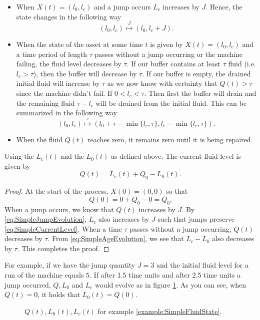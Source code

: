 \begin{itemize}
	\item When $X(t)=(l_0,l_c)$ and a jump occurs $L_c$ increases by $J$.
	Hence, the state changes in the following way
	\begin{equation}\label{eq:SimpleJumpEvolution}
	(l_0,l_c)\stackrel{J}{\mapsto} (l_0,l_c+J).
	\end{equation}
	\item When the state of the asset at some time $t$ is given by $X(t)=(l_0,l_c)$ and a time period of length $\tau$ passes without a jump occurring or the machine failing, the fluid level decreases by $\tau$.
	If our buffer contains at least $\tau$ fluid (i.e. $l_c>\tau$), then the buffer will decrease by $\tau$.
	If our buffer is empty, the drained initial fluid will increase by $\tau$ as we now know with certainty that $Q(t)>\tau$ since the machine didn't fail.
	If $0<l_c<\tau$. Then first the buffer will drain and the remaining fluid $\tau-l_c$ will be drained from the initial fluid.
	This can be summarized in the following way
	\begin{equation}\label{eq:SimpleAgeEvolution}
	(l_0,l_c)\stackrel\tau\mapsto (l_0+\tau-\min\{l_c,\tau\},l_c-\min\{l_c,\tau\}).
	\end{equation}
	\item When the fluid $Q(t)$ reaches zero, it remains zero until it is being repaired.
\end{itemize}
\begin{theorem}\label{theorem:SimpleCurrentLevel}
	Using the $L_c(t)$ and the $L_0(t)$ as defined above.
	The current fluid level is given by
	\begin{equation}\label{eq:SimpleCurrentLevel}
	Q(t)=L_c(t)+Q_0-L_0(t).
	\end{equation}
	\begin{proof}
		At the start of the process, $X(0)=(0,0)$ so that
		\[
		Q(0)=0+Q_0-0=Q_0.
		\]
		When a jump occurs, we know that $Q(t)$ increases by $J$.
		By \eqref{eq:SimpleJumpEvolution}, $L_c$ also increases by $J$ such that jumps preserve \eqref{eq:SimpleCurrentLevel}.
		When a time $\tau$ passes without a jump occurring, $Q(t)$ decreases by $\tau$.
		From \eqref{eq:SimpleAgeEvolution}, we see that $L_c-L_0$ also decreases by $\tau$.
		This completes the proof.
	\end{proof}
\end{theorem}

\begin{example}\label{example:SimpleFluidState}
	For example, if we have the jump quantity $J=3$ and the initial fluid level for a run of the machine equals $5$.
	If after 1.5 time units and after 2.5 time units a jump occurred, $Q,L_0$ and $L_c$ would evolve as in figure \ref{figure:SimpleFluidExampleQuantities}.
	As you can see, when $Q(t)=0$, it holds that $L_0(t)=Q(0)$.
\end{example}
\begin{figure}[H]\label{figure:SimpleFluidExampleQuantities}
\centering
\setlength{}

\caption{$Q(t),L_0(t),L_c(t)$ for example \ref{example:SimpleFluidState}.}
\end{figure}

